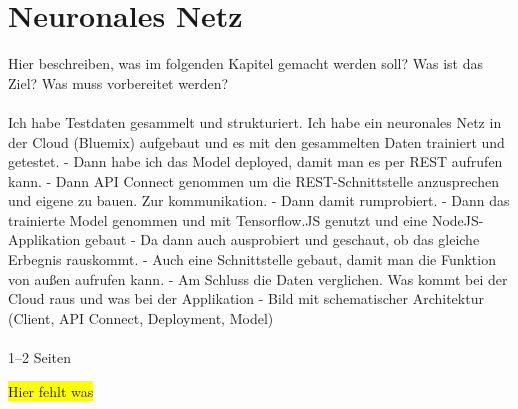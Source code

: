 \chapter{Neuronales Netz}
\label{ch:neuronalesNetz}

Hier beschreiben, was im folgenden Kapitel gemacht werden soll? Was ist das Ziel? Was muss vorbereitet werden?
\\ \\
Ich habe Testdaten gesammelt und strukturiert. Ich habe ein neuronales Netz in der Cloud (Bluemix) aufgebaut und es
mit den gesammelten Daten trainiert und getestet. - Dann habe ich das Model deployed, damit man es per REST aufrufen kann.
- Dann API Connect genommen um die REST-Schnittstelle anzusprechen und eigene zu bauen. Zur kommunikation.
- Dann damit rumprobiert. - Dann das trainierte Model genommen und mit Tensorflow.JS genutzt und eine NodeJS-Applikation gebaut
- Da dann auch ausprobiert und geschaut, ob das gleiche Erbegnis rauskommt.
- Auch eine Schnittstelle gebaut, damit man die Funktion von außen aufrufen kann. - Am Schluss die Daten verglichen. Was
kommt bei der Cloud raus und was bei der Applikation - Bild mit schematischer Architektur (Client, API Connect, Deployment, Model)
\\ \\
1--2 Seiten

\colorbox{yellow}{Hier fehlt was}